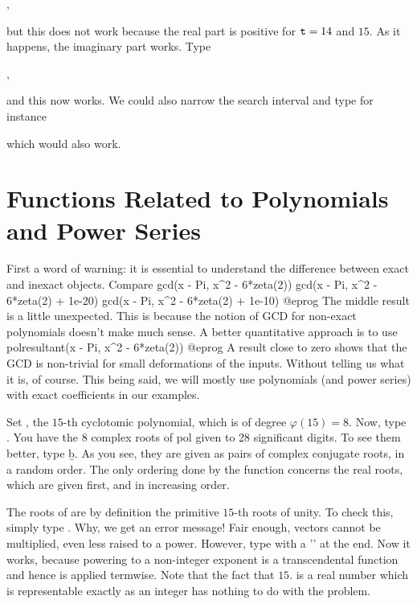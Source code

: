 ,

\noindent but this does not work because the real part is positive for
${\tt t}=14$ and $15$. As it happens, the imaginary part works. Type

,

\noindent and this now works. We could also narrow the search interval and
type for instance


\noindent which would also work.

\section{Functions Related to Polynomials and Power Series}

First a word of warning: it is essential to understand the difference between
exact and inexact objects. Compare
\bprog
  gcd(x - Pi, x^2 - 6*zeta(2))
  gcd(x - Pi, x^2 - 6*zeta(2) + 1e-20)
  gcd(x - Pi, x^2 - 6*zeta(2) + 1e-10)
@eprog\noindent
The middle result is a little unexpected. This is because the notion of GCD
for non-exact polynomials doesn't make much sense. A better quantitative
approach is to use
\bprog
  polresultant(x - Pi, x^2 - 6*zeta(2))
@eprog\noindent
A result close to zero shows that the GCD is non-trivial for small
deformations of the inputs. Without telling us what it is, of course. This
being said, we will mostly use polynomials (and power series) with exact
coefficients in our examples.\smallskip

Set , the $15$-th cyclotomic polynomial,
which is of degree $\varphi(15)=8$. Now, type . You
have the 8 complex roots of pol given to 28 significant digits. To see them
better, type \b{b}. As you see, they are given as pairs of complex conjugate
roots, in a random order. The only ordering done by the function
 concerns the real roots, which are given first, and in
increasing order.

The roots of  are by definition the primitive $15$-th roots of unity.
To check this, simply type . Why, we get an error message!
Fair enough, vectors cannot be multiplied, even less raised to a power.
However, type  with a '' at the end. Now it works,
because powering to a non-integer exponent is a transcendental function and
hence is applied termwise. Note that the fact that $15.$ is a real number
which is representable exactly as an integer has nothing to do with the
problem.

